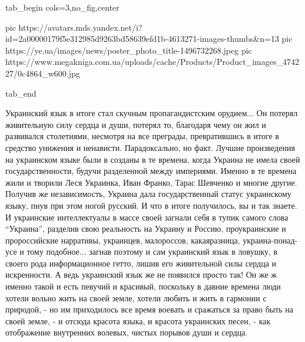 \ifcmt
  tab_begin cols=3,no_fig,center

     pic https://avatars.mds.yandex.net/i?id=2a00000179f5e312985d9263bd58639efd1b-4613271-images-thumbs&n=13
		 pic https://ye.ua/images/news/poster_photo_title-1496732268.jpeg
		 pic https://www.megakniga.com.ua/uploads/cache/Products/Product_images_474227/0c4864_w600.jpg

  tab_end
\fi

Украинский язык в итоге стал скучным пропагандистским орудием... Он потерял
живительную силу сердца и души, потерял то, благодаря чему он жил и развивался
столетиями, несмотря на все преграды, превратившись в итоге в средство унижения
и ненависти. Парадоксально, но факт. Лучшие произведения на украинском языке
были в созданы в те времена, когда Украина не имела своей государственности,
будучи разделенной между империями. Именно в те времена жили и творили Леся
Украинка, Иван Франко, Тарас Шевченко и многие другие. Получив же
независимость, Украина дала государственный статус украинскому языку, пнув при
этом ногой русский. И что в итоге получилось, вы и так знаете. И украинские
интеллектуалы в массе своей загнали себя в тупик самого слова
\enquote{Украина}, разделив свою реальность на Украину и Россию, проукраинские
и пророссийские нарративы, украинцев, малороссов, какаяразница,
украина-понад-усе и тому подобное... загнав поэтому и сам украинский язык в
ловушку, в своего рода информационное гетто, лишив его живительной силы сердца
и искренности. А ведь украинский язык же не появился просто так! Он же ж именно
такой и есть певучий и красивый, поскольку в давние времена люди хотели вольно
жить на своей земле, хотели любить и жить в гармонии с природой, - но им
приходилось все время воевать и сражаться за право быть на своей земле, - и
отсюда красота языка, и красота украинских песен, - как отображение внутренних
волевых, чистых порывов души и сердца.
